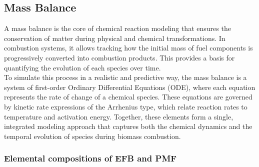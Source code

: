 \documentclass[preprint,12pt]{elsarticle}
\begin{document}
\subsection{Mass Balance}

A mass balance is the core of chemical reaction modeling that ensures the conservation of matter during physical and chemical transformations. In combustion systems, it allows tracking how the initial mass of fuel components is progressively converted into combustion products. This provides a basis for quantifying the evolution of each species over time.\\

To simulate this process in a realistic and predictive way, the mass balance is a system of first-order Ordinary Differential Equations (ODE), where each equation represents the rate of change of a chemical species. These equations are governed by kinetic rate expressions of the Arrhenius type, which relate reaction rates to temperature and activation energy. Together, these elements form a single, integrated modeling approach that captures both the chemical dynamics and the temporal evolution of species during biomass combustion.



\subsubsection{Elemental compositions of EFB and PMF}
\label{Initial Conditions for EFB and PMF Combustion}\\

\end{document}
